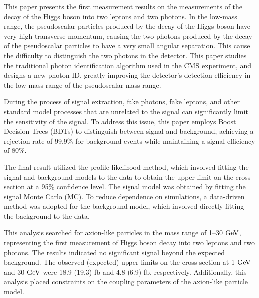 This paper presents the first measurement results on the measurements of the decay of the Higgs boson into two leptons and two photons. In the low-mass range, the pseudoscalar particles produced by the decay of the Higgs boson have very high transverse momentum, causing the two photons produced by the decay of the pseudoscalar particles to have a very small angular separation. This cause the difficulty to distinguish the two photons in the detector. This paper studies the traditional photon identification algorithm used in the CMS experiment, and designs a new photon ID, greatly improving the detector's detection efficiency in the low mass range of the pseudoscalar mass range.

During the process of signal extraction, fake photons, fake leptons, and other standard model processes that are unrelated to the signal can significantly limit the sensitivity of the signal. To address this issue, this paper employs Boost Decision Trees (BDTs) to distinguish between signal and background, achieving a rejection rate of 99.9\% for background events while maintaining a signal efficiency of 80\%.

The final result utilized the profile likelihood method, which involved fitting the signal and background models to the data to obtain the upper limit on the cross section at a 95\% confidence level. The signal model was obtained by fitting the signal Monte Carlo (MC). To reduce dependence on simulations, a data-driven method was adopted for the background model, which involved directly fitting the background to the data.

This analysis searched for axion-like particles in the mass range of 1--30$\GeV$, representing the first measurement of Higgs boson decay into two leptons and two photons. The results indicated no significant signal beyond the expected background. The observed (expected) upper limits on the cross section at 1$\GeV$ and 30$\GeV$ were 18.9 (19.3) \si{fb} and 4.8 (6.9) \si{fb}, respectively. Additionally, this analysis placed constraints on the coupling parameters of the axion-like particle model.


\pagestyle{enfrontmatterstyle}%
\cleardoublepage\pagestyle{frontmatterstyle}%

